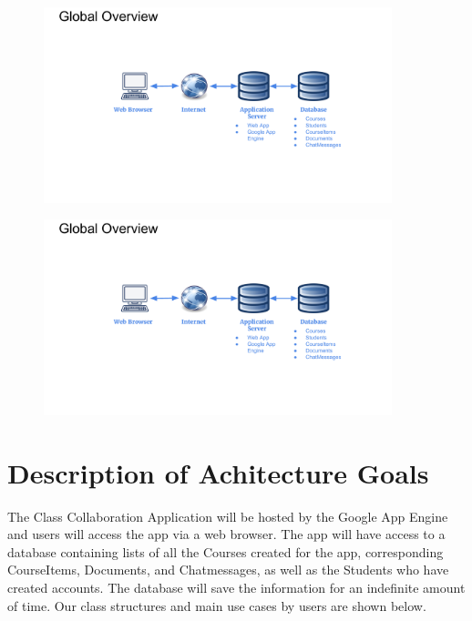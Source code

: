 \documentclass{scrreprt}
\begin{document}
\begin{figure}[ht]
  \centering
  \includegraphics[page=2,width=0.9\textwidth]{diagrams/SDD_Diagrams.pdf}
  \label{fig:SDD_1}
\end{figure}

\begin{figure}[ht]
  \centering
  \includegraphics[page=3,width=0.9\textwidth]{diagrams/SDD_Diagrams.pdf}
  \label{fig:SDD_1}
\end{figure}

\section{Description of Achitecture Goals}
The Class Collaboration Application will be hosted by the Google App Engine and users will access the app via a web browser. The app will have access to a database containing lists of all the Courses created for the app, corresponding CourseItems, Documents, and Chatmessages, as well as the Students who have created accounts. The database will save the information for an indefinite amount of time. Our class structures and main use cases by users are shown below. 
\end{document}
